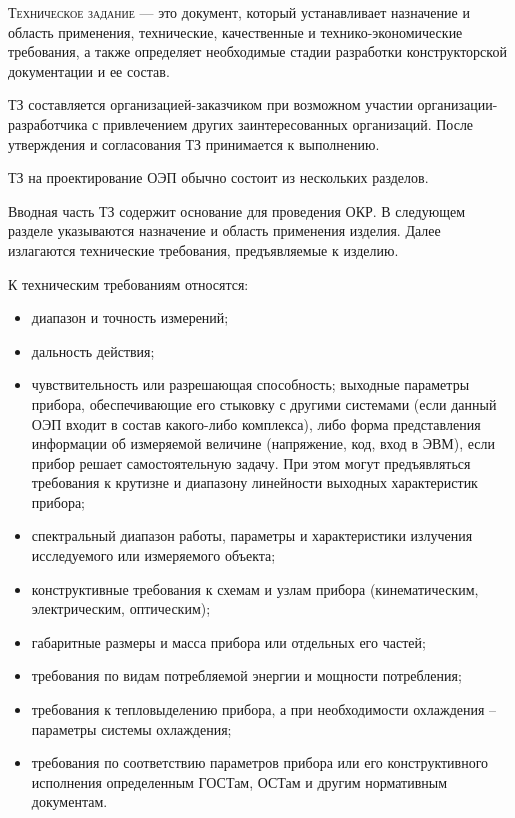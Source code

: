 \noindent
\textsc{Техническое задание} --- это документ, который устанавливает назначение и область применения, технические, качественные и технико-экономические требования, а также определяет необходимые стадии разработки конструкторской документации и ее состав.

ТЗ составляется организацией-заказчиком при возможном участии организации-разработчика с привлечением других заинтересованных организаций. После утверждения и согласования ТЗ принимается к выполнению.

ТЗ на проектирование ОЭП обычно состоит из нескольких разделов.

Вводная часть ТЗ содержит основание для проведения ОКР. В следующем разделе указываются назначение и область применения изделия. Далее излагаются технические требования, предъявляемые к изделию.

К техническим требованиям относятся:
\begin{itemize}
	\item диапазон и точность измерений; 
	\item дальность действия;
	\item чувствительность или разрешающая способность; выходные параметры прибора, обеспечивающие его стыковку с другими системами (если данный ОЭП входит в состав какого-либо комплекса), либо форма представления информации об измеряемой величине (напряжение, код, вход в ЭВМ), если прибор решает самостоятельную задачу. При этом могут предъявляться требования к крутизне и диапазону линейности выходных характеристик прибора;
	\item спектральный диапазон работы, параметры и характеристики излучения исследуемого или измеряемого объекта;
	\item конструктивные требования к схемам и узлам прибора (кинематическим, электрическим, оптическим);
	\item габаритные размеры и масса прибора или отдельных его частей;
	\item требования по видам потребляемой энергии и мощности потребления;
	\item требования к тепловыделению прибора, а при необходимости охлаждения -- параметры системы охлаждения;
	\item требования по соответствию параметров прибора или его конструктивного исполнения определенным ГОСТам, ОСТам и другим нормативным документам.
\end{itemize}


